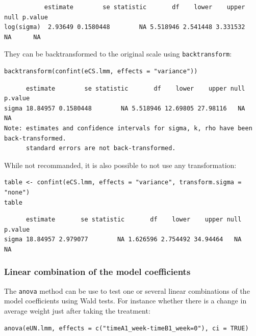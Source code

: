 \documentclass[12pt]{article}
\begin{document}
\begin{verbatim}
           estimate        se statistic       df    lower    upper null p.value
log(sigma)  2.93649 0.1580448        NA 5.518946 2.541448 3.331532   NA      NA
\end{verbatim}


They can be backtransformed to the original scale using \texttt{backtransform}:

\lstset{language=r,label= ,caption= ,captionpos=b,numbers=none}
\begin{lstlisting}
backtransform(confint(eCS.lmm, effects = "variance"))
\end{lstlisting}

\begin{verbatim}
      estimate        se statistic       df    lower    upper null p.value
sigma 18.84957 0.1580448        NA 5.518946 12.69805 27.98116   NA      NA
Note: estimates and confidence intervals for sigma, k, rho have been back-transformed. 
      standard errors are not back-transformed.
\end{verbatim}


While not recommanded, it is also possible to not use any transformation:
\lstset{language=r,label= ,caption= ,captionpos=b,numbers=none}
\begin{lstlisting}
table <- confint(eCS.lmm, effects = "variance", transform.sigma = "none")
table
\end{lstlisting}

\begin{verbatim}
      estimate       se statistic       df    lower    upper null p.value
sigma 18.84957 2.979077        NA 1.626596 2.754492 34.94464   NA      NA
\end{verbatim}

\subsubsection{Linear combination of the model coefficients}
\label{sec:orgd22128a}

The \texttt{anova} method can be use to test one or several linear
combinations of the model coefficients using Wald tests. For instance
whether there is a change in average weight just after taking the
treatment:
\lstset{language=r,label= ,caption= ,captionpos=b,numbers=none}
\begin{lstlisting}
anova(eUN.lmm, effects = c("timeA1_week-timeB1_week=0"), ci = TRUE)
\end{lstlisting}
\end{document}
